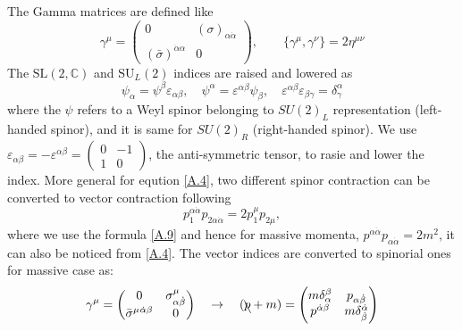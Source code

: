 \documentclass[12pt]{article}
\numberwithin{equation}{section}
\begin{document}
The Gamma matrices are defined like
\begin{equation}
    \gamma^\mu=\begin{pmatrix}
        0 & (\sigma)_{\alpha\dot{\alpha}}\\
        (\bar{\sigma})^{\dot{\alpha}\alpha} & 0 
    \end{pmatrix}, \qquad \{\gamma^\mu,\gamma^\nu\}=2\eta^{\mu\nu}
\end{equation}
The $\mathrm{SL}(2,\mathbb{C})$ and $\mathrm{SU}_L(2)$ indices are raised and lowered as
\begin{equation}
    \psi_\alpha = \psi^\beta \varepsilon_{\alpha\beta}, \quad
    \psi^\alpha = \varepsilon^{\alpha\beta} \psi_\beta, \quad
    \varepsilon^{\alpha\beta} \varepsilon_{\beta\gamma} = \delta^\alpha_\gamma
\end{equation}
where the $\psi$ refers to a Weyl spinor belonging to $SU(2)_L$ representation (left-handed spinor), and it is same for $SU(2)_R$ (right-handed spinor).  We use $\varepsilon_{\alpha\beta} = -\varepsilon^{\alpha\beta} = \begin{pmatrix} 0 & -1 \\ 1 & 0 \end{pmatrix}$, the anti-symmetric tensor, to rasie and lower the index. 
More general for eqution \eqref{A.4}, two different spinor contraction can be converted to vector contraction following
\begin{equation}
    p_1^{\alpha \dot\alpha} p_{2 \alpha \dot\alpha} = 2 p_1^\mu p_{2\mu}, 
\end{equation}
where we use the formula \eqref{A.9} and hence for massive momenta, $p^{\alpha\dot\alpha} p_{\alpha\dot\alpha} = 2m^2$, it can also be noticed from \eqref{A.4}. The vector indices are converted to spinorial ones for massive case as:
\begin{equation}
    \gamma^\mu =
    \begin{pmatrix}
        0 & \sigma^\mu_{\alpha\dot\beta} \\
        \bar{\sigma}^\mu{}^{\dot\alpha\beta} & 0
    \end{pmatrix}
    \quad \rightarrow \quad 
    (\bcancel{p} + m) =
    \begin{pmatrix}
        m \delta^\beta_\alpha & p_{\alpha \dot\beta} \\
        p^{\dot\alpha \beta} & m \delta^{\dot\alpha}_{\dot\beta}
    \end{pmatrix}
\end{equation}
\end{document}
